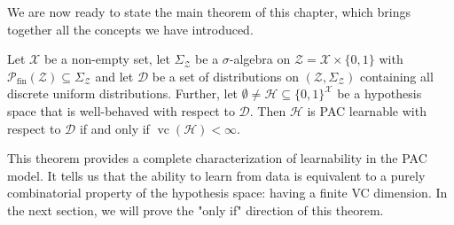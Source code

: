 We are now ready to state the main theorem of this chapter, which brings together all the concepts we have introduced.

\begin{theorem}
    \label{thm:fundamental-theorem}
    Let $\mathcal{X}$ be a non-empty set, let $\Sigma_{\mathcal{Z}}$ be a $\sigma$-algebra on $\mathcal{Z} = \mathcal{X} \times \{0,1\}$ with $\mathcal{P}_{\mathrm{fin}}(\mathcal{Z}) \subseteq \Sigma_{\mathcal{Z}}$ and let $\mathcal{D}$ be a set of distributions on $(\mathcal{Z},\Sigma_{\mathcal{Z}})$ containing all discrete uniform distributions. Further, let $\emptyset \neq \mathcal{H} \subseteq \{0,1\}^\mathcal{X}$ be a hypothesis space that is well-behaved with respect to $\mathcal{D}$. Then $\mathcal{H}$ is PAC learnable with respect to $\mathcal{D}$ if and only if $\operatorname{vc}(\mathcal{H}) < \infty$.
\end{theorem}

This theorem provides a complete characterization of learnability in the PAC model. It tells us that the ability to learn from data is equivalent to a purely combinatorial property of the hypothesis space: having a finite VC dimension. In the next section, we will prove the "only if" direction of this theorem.